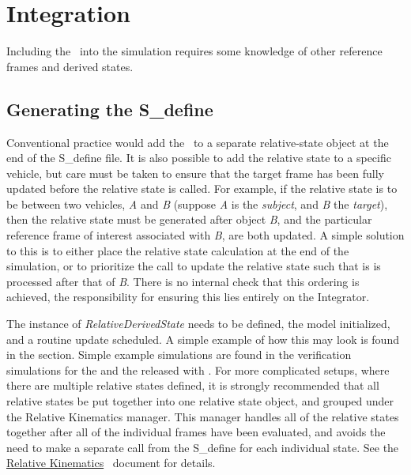 %
%
% 
%

 \section{Integration}
\label{sec:relativeintegration}

Including the \RelativeDesc\ into the simulation requires some knowledge of other reference frames and derived states.

 \subsection{Generating the S\_define}

Conventional practice would add the \RelativeDesc\ to a separate relative-state object at the end of the S\_define file.  It is also possible to add the relative state to a specific vehicle, but care must be taken to ensure that the target frame has been fully updated before the relative state is called.  For example, if the relative state is to be between two vehicles, \textit{A} and \textit{B} (suppose \textit{A} is the \textit{subject}, and \textit{B} the \textit{target}), then the relative state must be generated after object \textit{B}, and the particular reference frame of interest associated with \textit{B}, are both updated.  A simple solution to this is to either place the relative state calculation at the end of the simulation, or to prioritize the call to update the relative state such that is is processed after that of \textit{B}.  There is no internal check that this ordering is achieved, the responsibility for ensuring this lies entirely on the Integrator.

The instance of \textit{RelativeDerivedState} needs to be defined, the model initialized, and a routine update scheduled.  A simple example of how this may look is found in the  section.  Simple example simulations are found in the verification simulations for the  and the  released with \JEODid.  For more complicated setups, where there are multiple relative states defined, it is strongly recommended that all relative states be put together into one relative state object, and grouped under the Relative Kinematics manager.  This manager handles all of the relative states together after all of the individual frames have been evaluated, and avoids the need to make a separate call from the S\_define for each individual state.  See the \href{file:\JEODHOME/models/dynamics/rel\_kin/docs/rel\_kin.pdf}{Relative Kinematics}~\cite{dynenv:RELKIN} document for details.

